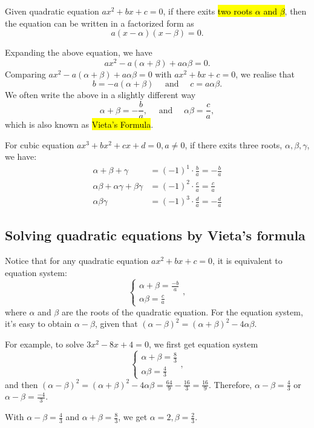 \documentclass[11pt, oneside]{article}   	%
\begin{document}
Given quadratic equation $ax^2+bx+c=0$, if there exits \hl{two roots $\alpha$ and $\beta$}, then the equation can be written in a factorized form as 
\[a(x-\alpha)(x-\beta) = 0.\] 

Expanding the above equation, we have 
\[ax^2-a(\alpha+\beta)+a\alpha\beta=0.\]
Comparing $ax^2-a(\alpha+\beta)+a\alpha\beta=0$ with $ax^2+bx+c=0$, we realise that 
\[b=-a(\alpha+\beta)\quad  \text{ and } \quad c=a\alpha\beta.\] 
We often write the above in a slightly different way 
\[\alpha+\beta=-\frac{b}{a}, \quad  \text{ and } \quad \alpha\beta=\frac{c}{a},\] 
which is also known as \hl{Vieta's Formula}. 

For cubic equation $ax^3+bx^2+cx+d=0, a \ne 0$, if there exits three roots, $\alpha, \beta, \gamma$, we have: 
\begin{align*}
\alpha + \beta + \gamma &= (-1)^1\cdot\frac{b}{a}=-\frac{b}{a}\\
\alpha\beta+\alpha\gamma+\beta\gamma &= (-1)^2\cdot\frac{c}{a}=\frac{c}{a}\\
\alpha\beta\gamma &= (-1)^3\cdot\frac{d}{a} = -\frac{d}{a}
\end{align*}

\subsection{Solving quadratic equations by Vieta's formula} 
Notice that for any quadratic equation $ax^2 + bx + c = 0$, it is equivalent to equation system: 
\[   
\begin{cases} 
\alpha + \beta = \frac{-b}{a}\\
\alpha \beta = \frac{c}{a}
\end{cases}     
, \]
 where $\alpha$ and $\beta$ are the roots of the quadratic equation. For the equation system, it's easy to obtain $\alpha - \beta$, given that $(\alpha - \beta)^2 = (\alpha + \beta)^2 - 4\alpha \beta$. 
 
 For example,  to solve $3x^2 - 8x + 4 = 0$, we first get equation system 
 \[   
\begin{cases} 
\alpha + \beta = \frac{8}{3}\\
\alpha \beta = \frac{4}{3}
\end{cases}     
, \]
and then $(\alpha - \beta)^2 = (\alpha + \beta)^2 - 4\alpha \beta = \frac{64}{9} - \frac{16}{3} = \frac{16}{9}$. Therefore, $\alpha - \beta = \frac{4}{3}$ or $\alpha - \beta = \frac{-4}{3}$.  

With $\alpha - \beta = \frac{4}{3}$ and $\alpha + \beta = \frac{8}{3}$, we get $\alpha = 2, \beta = \frac{2}{3}$. 
\end{document}
